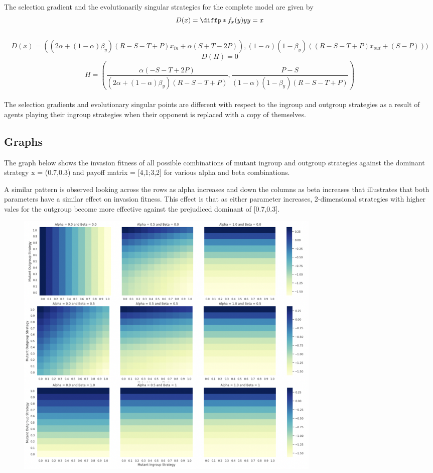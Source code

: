 \documentclass[]{llncs}
\begin{document}
The selection gradient and the evolutionarily singular strategies for the complete model are given by
\[
D(x) = \diffp*{f_x(y)}{y}{y=x}
\]
\\
\[
D(x) = ((2\alpha + (1-\alpha)\beta_y)(R - S - T + P) x_{in} + \alpha(S+T-2P)), (1-\alpha)(1-\beta_y)((R - S - T + P) x_{out} + (S-P)))
\]
\[
D(H) = 0
\]
\[
H = (\frac{\alpha(-S-T+2P)}{(2\alpha + (1-\alpha)\beta_y)(R - S - T + P)}, \frac{P-S}{(1-\alpha)(1-\beta_y)(R - S - T +P)}) 
\]
\\
The selection gradients and evolutionary singular points are different with respect to the ingroup and outgroup strategies as a result of agents playing their ingroup strategies when their opponent is replaced with a copy of themselves. 

\subsection{Graphs}

The graph below shows the invasion fitness of all possible combinations of mutant ingroup and outgroup strategies against the dominant strategy x = (0.7,0.3) and payoff matrix = [4,1;3,2] for various alpha and beta combinations. 

A similar pattern is observed looking across the rows as alpha increases and down the columns as beta increases that illustrates that both parameters have a similar effect on invasion fitness. This effect is that as either parameter increases, 2-dimensional strategies with higher vales for the outgroup become more effective against the prejudiced dominant of [0.7,0.3]. 

\begin{figure}
\centering
\includegraphics[width=15cm]{images/alpha_beta}
\end{figure}
\end{document}
